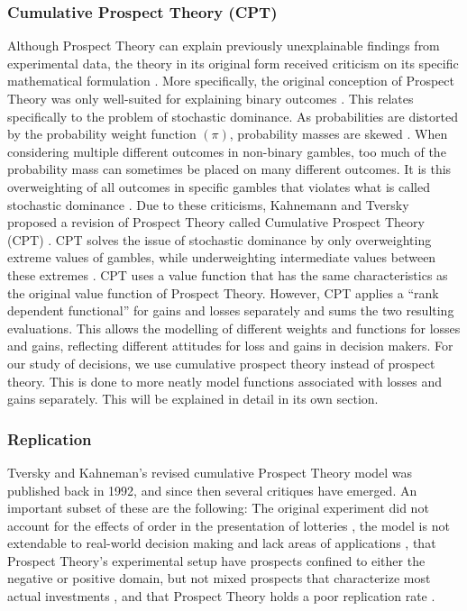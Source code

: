 \documentclass{article}
\begin{document}
    \subsubsection{Cumulative Prospect Theory (CPT)}
    Although Prospect Theory can explain previously unexplainable findings from experimental data, the theory in its original form received criticism on its specific mathematical formulation \cite{nilsson2011jomp}. More specifically, the original conception of Prospect Theory was only well-suited for explaining binary outcomes \cite{fennema1997original}. This relates specifically to the problem of stochastic dominance. As probabilities are distorted by the probability weight function $(\pi)$, probability masses are skewed \cite{fennema1997original}. When considering multiple different outcomes in non-binary gambles, too much of the probability mass can sometimes be placed on many different outcomes. It is this overweighting of all outcomes in specific gambles that violates what is called stochastic dominance \cite{fennema1997original}. 
Due to these criticisms, Kahnemann and Tversky proposed a revision of Prospect Theory called Cumulative Prospect Theory (CPT) \cite{tversky1992advances}. CPT solves the issue of stochastic dominance by only overweighting extreme values of gambles, while underweighting intermediate values between these extremes \cite{fennema1997original}. CPT  uses a value function that has the same characteristics as the original value function of Prospect Theory. However, CPT applies a “rank dependent functional” \cite{fennema1997original} for gains and losses separately and sums the two resulting evaluations. This allows the modelling of different weights and functions for losses and gains, reflecting different attitudes for loss and gains in decision makers. 
For our study of decisions, we use cumulative prospect theory instead of prospect theory. This is done to more neatly model functions associated with losses and gains separately. This will be explained in detail in its own section.

    \subsubsection{Replication}
    Tversky and Kahneman’s revised cumulative Prospect Theory model was published back in 1992, and since then several critiques have emerged. An important subset of these are the following: The original experiment did not account for the effects of order in the presentation of lotteries \cite{nwogugu2006amac}, the model is not extendable to real-world decision making and lack areas of applications \cite{rossiter2019jcb}, that Prospect Theory’s experimental setup have prospects confined to either the negative or positive domain, but not mixed prospects that characterize most actual investments \cite{levy2012hotfofdm}, and that Prospect Theory holds a poor replication rate \cite{millroth2019jdm}.
\end{document}

